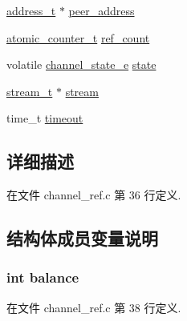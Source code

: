 \begin{DoxyCompactItemize}
\item 
\hyperlink{config_8h_a7a6e75b85c8b441f843bd40004a7d9d5}{address\+\_\+t} $\ast$ \hyperlink{struct__channel__ref__info__t_a715e0a061395c0388097a9b17f7c2f61}{peer\+\_\+address}
\item 
\hyperlink{config_8h_a0d043bbb6b8db19fea54ab9271d352b6}{atomic\+\_\+counter\+\_\+t} \hyperlink{struct__channel__ref__info__t_a73a762d7edaabfd6fbecd4329696ad4e}{ref\+\_\+count}
\item 
volatile \hyperlink{config_8h_a1956eea3012f780b5d592a9d09d9873c}{channel\+\_\+state\+\_\+e} \hyperlink{struct__channel__ref__info__t_a5eecc18e16d8b559a5a5206c9ac54106}{state}
\item 
\hyperlink{config_8h_a261dba04f46f5c59a68a05f69f5a65a8}{stream\+\_\+t} $\ast$ \hyperlink{struct__channel__ref__info__t_ab09d25996bb3fe59e4529131d4fde858}{stream}
\item 
time\+\_\+t \hyperlink{struct__channel__ref__info__t_afa7be8b85625b1bf5cda13fad9fd5814}{timeout}
\end{DoxyCompactItemize}


\subsection{详细描述}


在文件 channel\+\_\+ref.\+c 第 36 行定义.



\subsection{结构体成员变量说明}
\hypertarget{struct__channel__ref__info__t_ac794434112478f3134ad93778a0f2860}{}
\subsubsection[{balance}]{\setlength{\rightskip}{0pt plus 5cm}int balance}\label{struct__channel__ref__info__t_ac794434112478f3134ad93778a0f2860}


在文件 channel\+\_\+ref.\+c 第 38 行定义.

\hypertarget{struct__channel__ref__info__t_a7e4368584a7a6ebb47d2d69e37a77b61}{}
